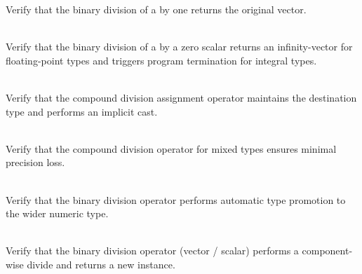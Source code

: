 \begin{DoxyRefList}
Verify that the binary division of a  by one returns the original vector.  
\item[{\parbox[t]{\linewidth}{Member \doxylink{group___f_g_m___vec4___division_ga0f12560dbc4cc7cb13d636ab10eacf16}{Vector4\+DScalar\+Division\+\_\+\+Division\+By\+Zero\+Returns\+Infinity\+Vector} ()}}]\hfill \\
\label{test__test000033}%
%
Verify that the binary division of a  by a zero scalar returns an infinity-\/vector for floating-\/point types and triggers program termination for integral types.  
\item[{\parbox[t]{\linewidth}{Member \doxylink{group___f_g_m___vec4___division_ga65d6353b0510aad14587bba58fc1a34f}{Vector4\+DScalar\+Division\+\_\+\+Mixed\+Type\+Scalar\+Division\+Assignment\+Does\+Not\+Promote\+Type} ()}}]\hfill \\
\label{test__test000038}%
%
Verify that the compound division assignment operator maintains the destination type and performs an implicit cast.  
\item[{\parbox[t]{\linewidth}{Member \doxylink{group___f_g_m___vec4___division_ga7a5758a23acd48130a6a550ab4933b9e}{Vector4\+DScalar\+Division\+\_\+\+Mixed\+Type\+Scalar\+Division\+Assignment\+Gives\+Result\+With\+Minimal\+Precision\+Loss} ()}}]\hfill \\
\label{test__test000039}%
%
Verify that the compound division operator for mixed types ensures minimal precision loss.  
\item[{\parbox[t]{\linewidth}{Member \doxylink{group___f_g_m___vec4___division_ga1998720892d4508dadeb805f74ae6469}{Vector4\+DScalar\+Division\+\_\+\+Mixed\+Type\+Scalar\+Division\+Promotes\+Type} ()}}]\hfill \\
\label{test__test000037}%
%
Verify that the binary division operator performs automatic type promotion to the wider numeric type.  
\item[{\parbox[t]{\linewidth}{Member \doxylink{group___f_g_m___vec4___division_gab4fbb04fb9f5cc50edc858906e2fda48}{Vector4\+DScalar\+Division\+\_\+\+Vector\+Divided\+By\+ANumber\+Returns\+AScaled\+Vector} ()}}]\hfill \\
\label{test__test000035}%
%
Verify that the binary division operator (vector /\+ scalar) performs a component-\/wise divide and returns a new  instance.  

\end{DoxyRefList}
